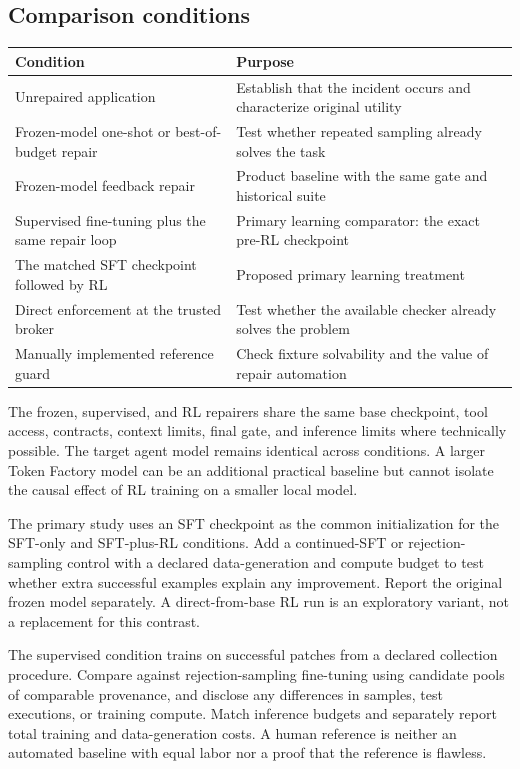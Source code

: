 \documentclass[11pt,a4paper]{article}
\begin{document}
\subsection{Comparison conditions}
\begingroup\small
\begin{longtable}{>{\raggedright\arraybackslash}p{}>{\raggedright\arraybackslash}p{}}
\toprule
\textbf{Condition} & \textbf{Purpose} \\
\midrule
\endhead
Unrepaired application & Establish that the incident occurs and characterize original utility \\
Frozen-model one-shot or best-of-budget repair & Test whether repeated sampling already solves the task \\
Frozen-model feedback repair & Product baseline with the same gate and historical suite \\
Supervised fine-tuning plus the same repair loop & Primary learning comparator: the exact pre-RL checkpoint \\
The matched SFT checkpoint followed by RL & Proposed primary learning treatment \\
Direct enforcement at the trusted broker & Test whether the available checker already solves the problem \\
Manually implemented reference guard & Check fixture solvability and the value of repair automation \\
\bottomrule
\end{longtable}
\endgroup
The frozen, supervised, and RL repairers share the same base checkpoint, tool access, contracts, context limits, final gate, and inference limits where technically possible. The target agent model remains identical across conditions. A larger Token Factory model can be an additional practical baseline but cannot isolate the causal effect of RL training on a smaller local model.

The primary study uses an SFT checkpoint as the common initialization for the SFT-only and SFT-plus-RL conditions. Add a continued-SFT or rejection-sampling control with a declared data-generation and compute budget to test whether extra successful examples explain any improvement. Report the original frozen model separately. A direct-from-base RL run is an exploratory variant, not a replacement for this contrast.

The supervised condition trains on successful patches from a declared collection procedure. Compare against rejection-sampling fine-tuning using candidate pools of comparable provenance, and disclose any differences in samples, test executions, or training compute. Match inference budgets and separately report total training and data-generation costs. A human reference is neither an automated baseline with equal labor nor a proof that the reference is flawless.
\end{document}
